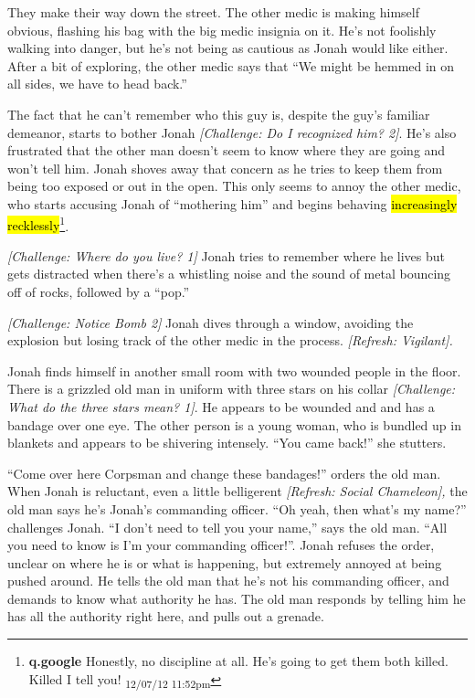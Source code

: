They make their way down the street.  The other medic is making himself obvious, flashing his bag with the big medic insignia on it.  He's not foolishly walking into danger, but he's not being as cautious as Jonah would like either.  After a bit of exploring, the other medic says that ``We might be hemmed in on all sides, we have to head back.''  



The fact that he can't remember who this guy is, despite the guy's familiar demeanor, starts to bother Jonah \textit{{[}Challenge: Do I recognized him? 2{]}}.  He's also frustrated that the other man doesn't seem to know where they are going and won't tell him.  Jonah shoves away that concern as he tries to keep them from being too exposed or out in the open.  This only seems to annoy the other medic, who starts accusing Jonah of ``mothering him'' and begins behaving \hl{increasingly recklessly}\footnote{\textbf{q.google }Honestly, no discipline at all.  He's going to get them both killed.  Killed I tell you! \textsubscript{12/07/12 11:52pm}}.



\textit{{[}Challenge: Where do you live? 1{]}} Jonah tries to remember where he lives but gets distracted when there's a whistling noise and the sound of metal bouncing off of rocks, followed by a ``pop.''

\textit{{[}Challenge: Notice Bomb 2{]}} Jonah dives through a window, avoiding the explosion but losing track of the other medic in the process. \textit{{[}Refresh: Vigilant{]}. }



Jonah finds himself in another small room with two wounded people in the floor.  There is a grizzled old man in uniform with three stars on his collar \textit{{[}Challenge: What do the three stars mean? 1{]}}.  He appears to be wounded and and has a bandage over one eye.  The other person is a young woman, who is bundled up in blankets and appears to be shivering intensely.  ``You came back!'' she stutters.



``Come over here Corpsman and change these bandages!'' orders the old man.  When Jonah is reluctant, even a little belligerent \textit{{[}Refresh: Social Chameleon{]}, }the old man says he's Jonah's commanding officer.  ``Oh yeah, then what's my name?'' challenges Jonah.  ``I don't need to tell you your name,'' says the old man.  ``All you need to know is I'm your commanding officer!''.  Jonah refuses the order, unclear on where he is or what is happening, but extremely annoyed at being pushed around.  He tells the old man that he's not his commanding officer, and demands to know what authority he has.  The old man responds by telling him he has all the authority right here, and pulls out a grenade.



